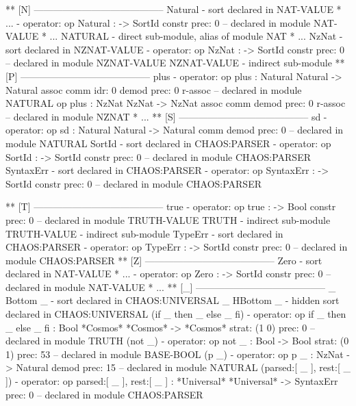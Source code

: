 \documentclass[a4paper,oneside,10pt]{memoir}
\newenvironment{vvtm}%
{\parskip=0pt\lineskip=0pt\begin{center}\begin{minipage}{0.8\textwidth}\begin{snugshade}}%
  {\end{snugshade}\end{minipage}\end{center}}
\begin{document}
\begin{vvtm}
\begin{examplev}
** [N] -----------------------------------------
Natural   
  - sort declared in NAT-VALUE * { ... }
  - operator:
    op Natural : -> SortId { constr prec: 0 }
        -- declared in module NAT-VALUE * { ... }
NATURAL   
  - direct sub-module, alias of module NAT *{  ...  }
NzNat     
  - sort declared in NZNAT-VALUE
  - operator:
    op NzNat : -> SortId { constr prec: 0 }
        -- declared in module NZNAT-VALUE
NZNAT-VALUE 
  - indirect sub-module
** [P] -----------------------------------------
plus      
  - operator:
    op plus : Natural Natural -> Natural { assoc comm idr: 0 demod
                                           prec: 0 r-assoc }
        -- declared in module NATURAL
    op plus : NzNat NzNat -> NzNat { assoc comm demod prec: 0 r-assoc }
        -- declared in module NZNAT * { ... }
** [S] -----------------------------------------
sd        
  - operator:
    op sd : Natural Natural -> Natural { comm demod prec: 0 }
        -- declared in module NATURAL
SortId    
  - sort declared in CHAOS:PARSER
  - operator:
    op SortId : -> SortId { constr prec: 0 }
        -- declared in module CHAOS:PARSER
SyntaxErr 
  - sort declared in CHAOS:PARSER
  - operator:
    op SyntaxErr : -> SortId { constr prec: 0 }
        -- declared in module CHAOS:PARSER
\end{examplev}
\end{vvtm}
\begin{vvtm}
\begin{examplev}
** [T] -----------------------------------------
true      
  - operator:
    op true : -> Bool { constr prec: 0 }
        -- declared in module TRUTH-VALUE
TRUTH     
  - indirect sub-module
TRUTH-VALUE 
  - indirect sub-module
TypeErr   
  - sort declared in CHAOS:PARSER
  - operator:
    op TypeErr : -> SortId { constr prec: 0 }
        -- declared in module CHAOS:PARSER
** [Z] -----------------------------------------
Zero      
  - sort declared in NAT-VALUE * { ... }
  - operator:
    op Zero : -> SortId { constr prec: 0 }
        -- declared in module NAT-VALUE * { ... }
** [_] -----------------------------------------
_ Bottom _ 
  - sort declared in CHAOS:UNIVERSAL
_ HBottom _ 
  - hidden sort declared in CHAOS:UNIVERSAL
(if _ then _ else _ fi) 
  - operator:
    op if _ then _ else _ fi : Bool *Cosmos* *Cosmos* -> *Cosmos* { strat: (1 0)
                                                                    prec: 0
                                                                    }
        -- declared in module TRUTH
(not _)   
  - operator:
    op not _ : Bool -> Bool { strat: (0 1) prec: 53 }
        -- declared in module BASE-BOOL
(p _)     
  - operator:
    op p _ : NzNat -> Natural { demod prec: 15 }
        -- declared in module NATURAL
(parsed:[ _ ], rest:[ _ ]) 
  - operator:
    op parsed:[ _ ], rest:[ _ ] : *Universal* *Universal* -> SyntaxErr
                                  { prec: 0 }
        -- declared in module CHAOS:PARSER
\end{examplev}
\end{vvtm}
\end{document}
